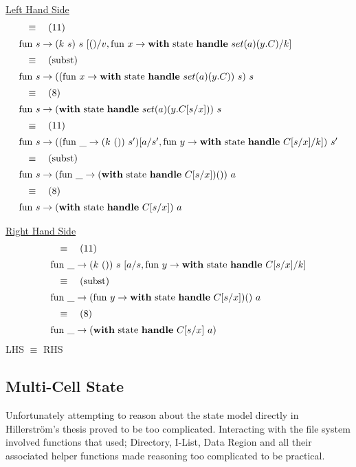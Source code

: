 \documentclass[logo,bsc,singlespacing,parskip]{infthesis}
\begin{document}
\underline{Left Hand Side}
\[ 
\begin{array}{l}
\quad\equiv\quad (11) \\[5pt]
\text{fun } s \rightarrow (k\ s)\ s\ [()/v, \text{fun } x \rightarrow \text{\textbf{with} state \textbf{handle} } set(a)(y.C)/k] \\[5pt]
\quad\equiv\quad (\text{subst}) \\[5pt]
\text{fun } s \rightarrow ((\text{fun } x \rightarrow \text{\textbf{with} state \textbf{handle} } set(a)(y.C))\ s)\ s \\[5pt]
\quad\equiv\quad (8) \\[5pt]
\text{fun } s \rightarrow (\text{\textbf{with} state \textbf{handle} } set(a)(y.C[s/x]))\ s \\[5pt]
\quad\equiv\quad (11) \\[5pt]
\text{fun } s \rightarrow ((\text{fun } \_ \rightarrow (k\ ())\ s')[a/s', \text{fun } y \rightarrow \text{\textbf{with} state \textbf{handle} } C[s/x]/k])\ s' \\[5pt]
\quad\equiv\quad (\text{subst}) \\[5pt]
\text{fun } s \rightarrow (\text{fun } \_ \rightarrow (\text{\textbf{with} state \textbf{handle} } C[s/x]) ())\ a \\[5pt]
\quad\equiv\quad (8) \\[5pt]
\text{fun } s \rightarrow (\text{\textbf{with} state \textbf{handle} } C[s/x])\ a
\end{array}
\]


\underline{Right Hand Side}
\[ 
\begin{array}{l}
\quad\equiv\quad (11) \\[5pt]
\text{fun }\_ \rightarrow (k\ ())\ s\ [a/s, \text{fun } y \rightarrow \text{\textbf{with} state \textbf{handle} } C[s/x]/k] \\[5pt]
\quad\equiv\quad (\text{subst}) \\[5pt]
\text{fun }\_ \rightarrow (\text{fun } y \rightarrow \text{\textbf{with} state \textbf{handle} } C[s/x]) ()\ a \\[5pt]
\quad\equiv\quad (8) \\[5pt]
\text{fun }\_ \rightarrow (\text{\textbf{with} state \textbf{handle} } C[s/x]\ a)
\end{array}
\]
LHS $\equiv$ RHS

\subsection{Multi-Cell State}
Unfortunately attempting to reason about the state model directly in Hillerström's thesis proved to be too complicated. Interacting with the file system involved functions that used; Directory, I-List, Data Region and all their associated helper functions made reasoning too complicated to be practical. 
\end{document}
